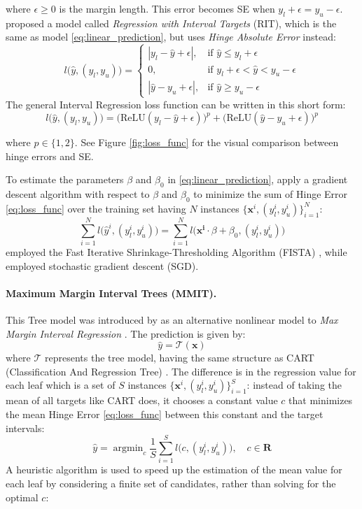 \documentclass[12pt]{article}
\DeclareMathOperator*{\argmin}{argmin}
\begin{document}
\noindent where $\epsilon \geq 0$ is the margin length.
This error becomes SE when $y_l +\epsilon = y_u - \epsilon$.
\citet{rit} proposed a model called \textit{Regression with Interval Targets} (RIT), which is the same as model \eqref{eq:linear_prediction}, but uses \textit{Hinge Absolute Error} instead:
$$l\Big(\hat{y}, (y_l, y_u)\Big) = 
\begin{cases} 
    |y_l - \hat{y} + \epsilon|, & \mbox{if } \hat{y} \leq y_l + \epsilon \\
    0, & \mbox{if } y_l + \epsilon < \hat{y} < y_u - \epsilon \\
    |\hat{y} - y_u + \epsilon|, & \mbox{if } \hat{y} \geq y_u - \epsilon
\end{cases}$$
\noindent The general Interval Regression loss function can be written in this short form:
\begin{equation}
    l\Big(\hat{y}, (y_l, y_u)\Big) = \Big( \text{ReLU}(y_l - \hat{y} + \epsilon)\Big)^p + \Big(\text{ReLU}(\hat{y} - y_u + \epsilon) \Big)^p
\end{equation}

\noindent where $p \in \{1, 2\}$. See Figure \ref{fig:loss_func} for the visual comparison between hinge errors and SE.

To estimate the parameters $\beta$ and $\beta_0$ in \eqref{eq:linear_prediction}, apply a gradient descent algorithm with respect to $\beta$ and $\beta_0$ to minimize the sum of Hinge Error \eqref{eq:loss_func} over the training set having $N$ instances $\{\mathbf{x}^i, (y_l^i, y_u^i)\}_{i=1}^N$:
\begin{equation*}
    \sum_{i = 1}^N l\Big(\hat{y}^i, (y_l^i, y_u^i)\Big) = \sum_{i = 1}^N l\Big(\mathbf{x^i} \cdot \beta + \beta_0, (y_l^i, y_u^i)\Big)
\end{equation*}
\citet{rigaill:13} employed the Fast Iterative Shrinkage-Thresholding Algorithm (FISTA) \citep{fista}, while \citet{rit} employed stochastic gradient descent (SGD).


\paragraph{Maximum Margin Interval Trees (MMIT).} This Tree model was introduced by \citet{mmit} as an alternative nonlinear model to \textit{Max Margin Interval Regression} \citep{rigaill:13}.
The prediction is given by:
\[
\hat{y} = \mathcal{T}(\mathbf{x})
\]
where \(\mathcal{T}\) represents the tree model, having the same structure as CART (Classification And Regression Tree) \citep{cart}. 
The difference is in the regression value for each leaf which is a set of $S$ instances $\{\mathbf{x}^i, (y_l^i,y_u^i)\}_{i=1}^S$: instead of taking the mean of all targets like CART does, it chooses a constant value $c$ that minimizes the mean Hinge Error \eqref{eq:loss_func} between this constant and the target intervals:
\begin{equation*}
    \hat{y} = \argmin_c \frac{1}{S} \sum_{i=1}^{S} l\big(c, (y_l^i, y_u^i)\big), \quad c \in \mathbf{R}
\end{equation*}
\noindent A heuristic algorithm is used to speed up the estimation of the mean value for each leaf by considering a finite set of candidates, rather than solving for the optimal $c$:
\end{document}
